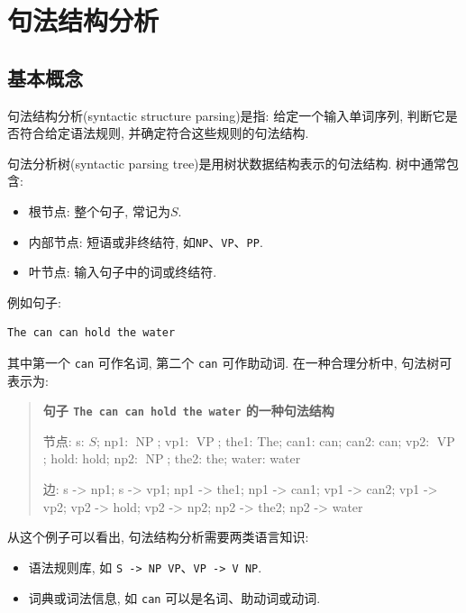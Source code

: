 \section{句法结构分析}


\subsection{基本概念}


句法结构分析(syntactic structure parsing)是指:
给定一个输入单词序列, 判断它是否符合给定语法规则, 并确定符合这些规则的句法结构.

句法分析树(syntactic parsing tree)是用树状数据结构表示的句法结构.
树中通常包含:

\begin{itemize}
\item 根节点: 整个句子, 常记为$S$.
\item 内部节点: 短语或非终结符, 如\texttt{NP}、\texttt{VP}、\texttt{PP}.
\item 叶节点: 输入句子中的词或终结符.
\end{itemize}

例如句子:

\begin{Verbatim}[breaklines=true,breakanywhere=true,fontsize=\small]
The can can hold the water
\end{Verbatim}

其中第一个 \texttt{can} 可作名词, 第二个 \texttt{can} 可作助动词.
在一种合理分析中, 句法树可表示为:

\begin{quote}
\small
\textbf{句子 \texttt{The can can hold the water} 的一种句法结构}
\par 节点: s: $S$; np1: $\operatorname{NP}$; vp1: $\operatorname{VP}$; the1: The; can1: can; can2: can; vp2: $\operatorname{VP}$; hold: hold; np2: $\operatorname{NP}$; the2: the; water: water
\par 边: s -\textgreater{} np1; s -\textgreater{} vp1; np1 -\textgreater{} the1; np1 -\textgreater{} can1; vp1 -\textgreater{} can2; vp1 -\textgreater{} vp2; vp2 -\textgreater{} hold; vp2 -\textgreater{} np2; np2 -\textgreater{} the2; np2 -\textgreater{} water
\end{quote}

从这个例子可以看出, 句法结构分析需要两类语言知识:

\begin{itemize}
\item 语法规则库, 如 \texttt{S -\textgreater{} NP VP}、\texttt{VP -\textgreater{} V NP}.
\item 词典或词法信息, 如 \texttt{can} 可以是名词、助动词或动词.
\end{itemize}

